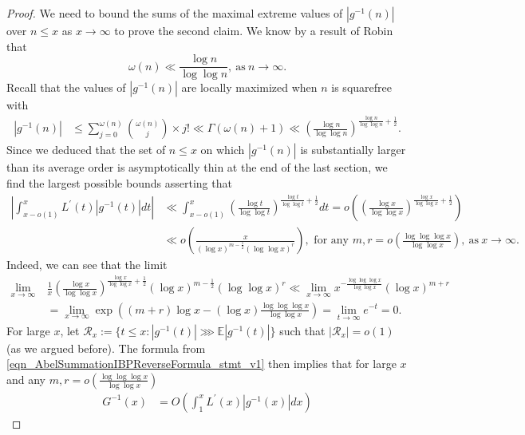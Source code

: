 \documentclass[11pt,reqno,a4letter]{article}
\numberwithin{figure}{section}
\numberwithin{table}{section}
\theoremstyle{plain}
\numberwithin{theorem}{section}
\theoremstyle{definition}
\begin{document}
\begin{proof}
We need to bound the sums of the maximal extreme values of $|g^{-1}(n)|$ over $n \leq x$
as $x \rightarrow \infty$ to prove the second claim. 
We know by a result of Robin that \cite{ROBIN-PRIMEOMEGAFUNC-BOUNDS}
\[
\omega(n) \ll \frac{\log n}{\log\log n}, \mathrm{\ as\ } n \rightarrow \infty. 
\]
Recall that the values of $|g^{-1}(n)|$ are locally maximized when $n$ is squarefree with 
\begin{align*}
|g^{-1}(n)| & \leq \sum_{j=0}^{\omega(n)} \binom{\omega(n)}{j} \times j! 
     \ll \Gamma(\omega(n)+1) 
     \ll \left(\frac{\log n}{\log\log n}\right)^{\frac{\log n}{\log\log n} + \frac{1}{2}}. 
\end{align*}
Since we deduced that the set of $n \leq x$ on which $|g^{-1}(n)|$ is substantially larger 
than its average order is asymptotically thin at the end of the last section, 
we find the largest possible bounds asserting that 
\begin{align*}
     \left\lvert \int_{x-o(1)}^{x} L^{\prime}(t) |g^{-1}(t)| dt\right\vert & \ll 
\int_{x-o(1)}^{x} \left(\frac{\log t}{\log\log t}\right)^{\frac{\log t}{\log\log t} + 
     \frac{1}{2}} dt 
     = o\left(\left(\frac{\log x}{\log\log x}\right)^{\frac{\log x}{\log\log x} + \frac{1}{2}}\right) \\ 
     & \ll o\left(\frac{x}{(\log x)^{m-\frac{1}{2}} (\log\log x)^r}\right), \text{\ for\ any\ } 
     m, r = o\left(\frac{\log\log\log x}{\log\log x}\right), 
     \mathrm{\ as\ } x \rightarrow \infty. 
\end{align*}
Indeed, we can see that the limit 
\begin{align*}
     \lim_{x \rightarrow \infty}\ & \frac{1}{x} \left(\frac{\log x}{\log\log x} 
     \right)^{\frac{\log x}{\log\log x} + \frac{1}{2}} (\log x)^{m-\frac{1}{2}} (\log\log x)^r \ll 
\lim_{x \rightarrow \infty} x^{-\frac{\log\log\log x}{\log\log x}} 
     (\log x)^{m+r} \\ 
     & = \lim_{x \rightarrow \infty} \exp\left((m+r) \log x - (\log x) 
     \frac{\log\log\log x}{\log\log x}\right) 
     = \lim_{t \rightarrow \infty} e^{-t} = 0. 
\end{align*} 
For large $x$, let $\mathcal{R}_x := \{t \leq x: |g^{-1}(t)| \ggg \mathbb{E}|g^{-1}(t)|\}$ such that 
$|\mathcal{R}_x| = o(1)$ (as we argued before). 
The formula from \eqref{eqn_AbelSummationIBPReverseFormula_stmt_v1} then implies 
that for large $x$ and any $m, r = o\left(\frac{\log\log\log x}{\log\log x}\right)$ 
\begin{align*}
G^{-1}(x) & = O\left(\int_1^x L^{\prime}(x) |g^{-1}(x)| dx\right) 

\end{align*}
\end{proof}
\end{document}
